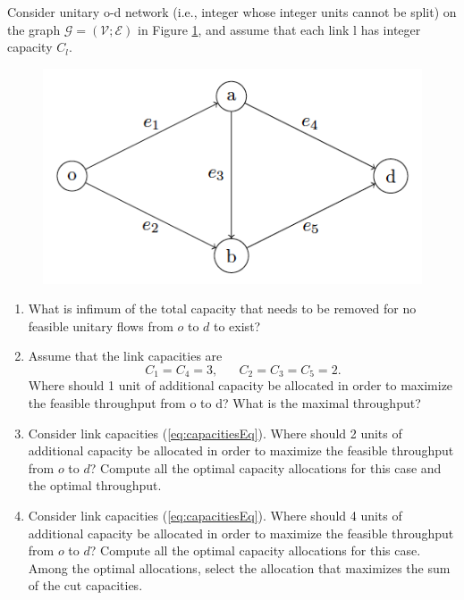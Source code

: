 \documentclass[
	12pt, %
]{fphw}
\begin{document}
Consider unitary o-d network (i.e., integer whose integer units cannot be
split) on the graph $\mathcal{G} = (\mathcal{V}; \mathcal{E})$ in Figure \ref{fig:givenGraphEx1}, and assume that each link l has integer capacity $C_l$.
\begin{figure}[H]
    \centering
	\includegraphics[width=0.5\columnwidth]{graphEx1.png} %
	\caption{}
	\label{fig:givenGraphEx1}
\end{figure}
\begin{enumerate}[(a\normalfont)] %
	\item What is infimum of the total capacity that needs to be removed for no feasible unitary flows from $o$ to $d$ to exist?
	\item Assume that the link capacities are
	    \begin{equation}\label{eq:capacitiesEq}
	        C_1 = C_4 = 3, \hspace{20pt} C_2 = C_3 = C_5 = 2.
	   \end{equation}
	    Where should 1 unit of additional capacity be allocated in order to maximize the feasible throughput from o to d? What is the maximal throughput?
	\item Consider link capacities (\ref{eq:capacitiesEq}). Where should 2 units of additional capacity be allocated in order to maximize the feasible throughput from $o$ to $d$? Compute all the optimal capacity allocations for this case and the optimal throughput.
	\item Consider link capacities (\ref{eq:capacitiesEq}). Where should 4 units of additional capacity be allocated in order to maximize the feasible throughput from $o$ to $d$? Compute all the optimal capacity allocations for this case. Among the optimal allocations, select the allocation that maximizes the sum of the cut capacities.
\end{enumerate}

\end{document}
